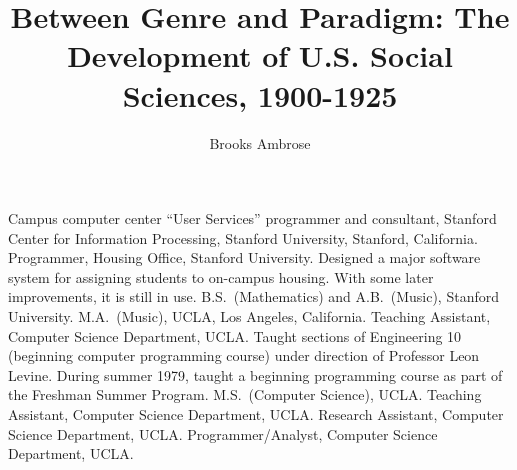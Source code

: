 
\title          {Between Genre and Paradigm: The Development of U.S. Social Sciences, 1900-1925}
\author         {Brooks Ambrose}




\dedication     {\textsl{To my parents \ldots \\
                who raised us to guided by our light \\ \\
                To my love \ldots \\
                who raised me above my limits}}




%
%
                {Campus computer center ``User Services'' programmer and
                consultant, Stanford Center for Information Processing,
                Stanford University, Stanford, California.}
                {Programmer, Housing Office, Stanford University.
                Designed a major software system for assigning
                students to on-campus housing.
                With some later improvements, it is still in use.}
                {B.S.~(Mathematics) and A.B.~(Music),
                Stanford University.}
                {M.A.~(Music), UCLA, Los Angeles, California.}
                {Teaching Assistant, Computer Science Department, UCLA.
                Taught sections of Engineering 10 (beginning computer
                programming course) under direction of Professor Leon
                Levine.
                During summer 1979, taught a beginning programming
                course as part of the Freshman Summer Program.}
                {M.S.~(Computer Science), UCLA.}
                {Teaching Assistant, Computer Science Department, UCLA.}
                {Research Assistant, Computer Science Department, UCLA.}
                {Programmer/Analyst, Computer Science Department, UCLA.}


